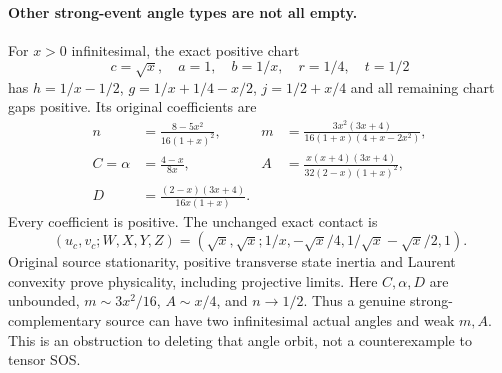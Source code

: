 \paragraph{Other strong-event angle types are not all empty.}
For $x>0$ infinitesimal, the exact positive chart
\[
 c=\sqrt x,\quad a=1,\quad b=1/x,\quad r=1/4,\quad t=1/2
\]
has $h=1/x-1/2$, $g=1/x+1/4-x/2$, $j=1/2+x/4$ and all
remaining chart gaps positive. Its original coefficients are
\begin{align*}
 n&=\frac{8-5x^2}{16(1+x)^2},&
 m&=\frac{3x^2(3x+4)}{16(1+x)(4+x-2x^2)},\\
 C=\alpha&=\frac{4-x}{8x},&
 A&=\frac{x(x+4)(3x+4)}{32(2-x)(1+x)^2},\\
 D&=\frac{(2-x)(3x+4)}{16x(1+x)}.
\end{align*}
Every coefficient is positive. The unchanged exact contact is
\[
 (u_c,v_c;W,X,Y,Z)
 =(\sqrt x,\sqrt x;1/x,-\sqrt x/4,1/\sqrt x-\sqrt x/2,1).
\]
Original source stationarity, positive transverse state inertia and
Laurent convexity prove physicality, including projective limits.
Here $C,\alpha,D$ are unbounded, $m\sim3x^2/16$, $A\sim x/4$,
and $n\to1/2$. Thus a genuine strong-complementary source can have
two infinitesimal actual angles and weak $m,A$. This is an obstruction
to deleting that angle orbit, not a counterexample to tensor SOS.
